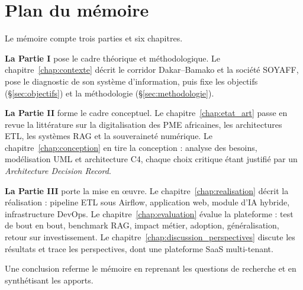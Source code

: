 \section*{Plan du mémoire}
\label{sec:plan_memoire}

Le mémoire compte trois parties et six chapitres.

\textbf{La Partie I} pose le cadre théorique et méthodologique. Le chapitre~\ref{chap:contexte} décrit le corridor Dakar--Bamako et la société SOYAFF, pose le diagnostic de son système d'information, puis fixe les objectifs (\S\ref{sec:objectifs}) et la méthodologie (\S\ref{sec:methodologie}).

\textbf{La Partie II} forme le cadre conceptuel. Le chapitre~\ref{chap:etat_art} passe en revue la littérature sur la digitalisation des PME africaines, les architectures ETL, les systèmes RAG et la souveraineté numérique. Le chapitre~\ref{chap:conception} en tire la conception : analyse des besoins, modélisation UML et architecture C4, chaque choix critique étant justifié par un \textit{Architecture Decision Record}.

\textbf{La Partie III} porte la mise en œuvre. Le chapitre~\ref{chap:realisation} décrit la réalisation : pipeline ETL sous Airflow, application web, module d'IA hybride, infrastructure DevOps. Le chapitre~\ref{chap:evaluation} évalue la plateforme : test de bout en bout, benchmark RAG, impact métier, adoption, généralisation, retour sur investissement. Le chapitre~\ref{chap:discussion_perspectives} discute les résultats et trace les perspectives, dont une plateforme SaaS multi-tenant.

Une conclusion referme le mémoire en reprenant les questions de recherche et en synthétisant les apports.

